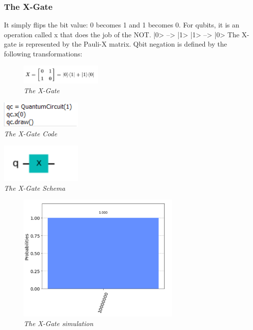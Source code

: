 \documentclass{article}
\begin{document}
\subsubsection{The X-Gate}
It simply flips the bit value: 0 becomes 1 and 1 becomes 0. For qubits, it is an operation called x that does the job of the NOT.
|0> --> |1> \tab |1> --> |0>
The X-gate is represented by the Pauli-X matrix.
Qbit negation is defined by the following transformations:
\begin{figure}[h]
\begin{center}
\begin{minipage}[b]{4cm}
\centering
\includegraphics[width=4cm]{x_gate.png}\\\textit{The X-Gate}
\end{minipage}
\end{center}
\end{figure}
\begin{mdframed}
\begin{center}
\begin{minipage}[b]{4cm}
\centering
\includegraphics[width=4cm]{x_code.png}\\\textit{The X-Gate Code}
\end{minipage}
\begin{minipage}[b]{4cm}
\centering
\includegraphics[width=4cm]{x_gate_schema.png}\\\textit{The X-Gate Schema}
\end{minipage}
\end{center}
\end{mdframed}
\begin{figure}[h]
\begin{center}
\begin{minipage}[b]{8cm}
\centering
\includegraphics[width=8cm]{not_sym.png}\\\textit{The X-Gate simulation}
\end{minipage}
\end{center}
\end{figure}
\newpage
\end{document}

